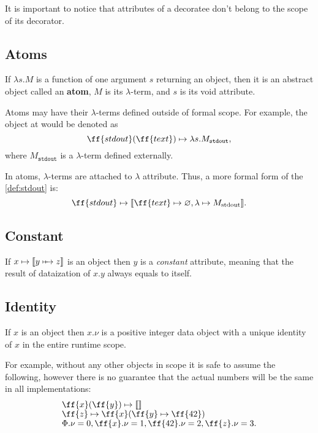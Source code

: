 It is important to notice that attributes of a decoratee
don't belong to the scope of its decorator.

\subsection{Atoms}

\begin{definition}\label{def:atom}
If \(\lambda s.M\) is a function of one argument \(s\) returning an object,
then it is an abstract object called an \textbf{atom}, \(M\) is its \(\lambda\)-term,
and \(s\) is its void attribute.
\end{definition}

Atoms may have their \(\lambda\)-terms defined outside of \phic{} formal scope.
For example, the object at  would be denoted as
\begin{equation}\label{def:stdout}
\ff{stdout}(\ff{text}) \mapsto \lambda s.M_\texttt{stdout},
\end{equation}
where \(M_\texttt{stdout}\) is a \(\lambda\)-term defined externally.

In atoms, \(\lambda\)-terms are attached to \(\lambda\) attribute.
Thus, a more formal form of the \cref{def:stdout} is:
\begin{equation*}
\ff{stdout} \mapsto \llbracket \ff{text} \mapsto \varnothing, \lambda \mapsto M_\text{stdout} \rrbracket.
\end{equation*}

\subsection{Constant}

\newcommand\cmapsto{\mapstochar\relbar\mathrel{\mkern-8mu}\mapsto}
\begin{definition}\label{def:identity}
If \(x \mapsto \llbracket y \cmapsto z \rrbracket\) is an object
then \(y\) is a \emph{constant} attribute, meaning that
the result of dataization of \(x.y\) always equals to itself.
\end{definition}

\subsection{Identity}

\begin{definition}\label{def:constant}
If \(x\) is an object then \(x.\nu\) is a positive integer data object
with a unique identity of \(x\) in the entire runtime scope.
\end{definition}

For example, without any other objects in scope it is safe
to assume the following, however there is no guarantee that
the actual numbers will be the same in all implementations:
\begin{equation}
\begin{split}
& \ff{x}(\ff{y}) \mapsto \llbracket \rrbracket \br
& \ff{z} \mapsto \ff{x} ( \ff{y} \mapsto \ff{42} ) \br
& \Phi.\nu = 0, \ff{x}.\nu = 1, \ff{42}.\nu = 2, \ff{z}.\nu = 3.
\end{split}
\end{equation}

